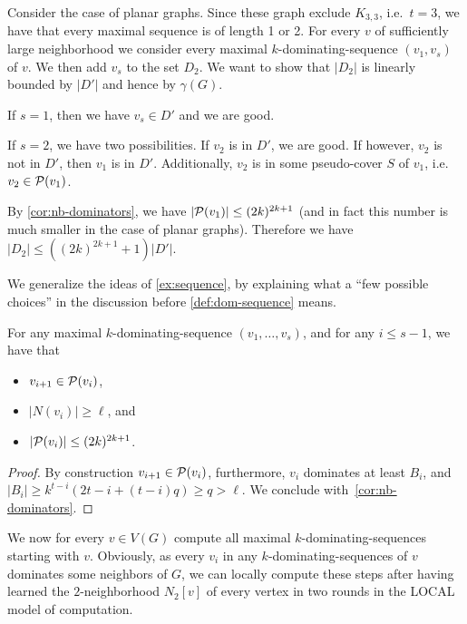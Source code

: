 \begin{example}\label{ex:sequence}
  Consider the case of planar graphs. Since these graph exclude $K_{3,3}$,
  i.e.~$t=3$, we have that every maximal sequence is of length 1 or 2.
  For every $v$ of sufficiently large neighborhood we consider every
  maximal $k$-dominating-sequence $(v_1,v_s)$ of $v$.
  We then add $v_s$ to the set $D_2$. We want to show that $|D_2|$ is
  linearly bounded by $|D'|$ and hence by $\gamma(G)$.

  If $s=1$, then we have $v_s\in D'$ and we are good.

  If $s=2$, we have two possibilities. If $v_2$ is in $D'$, we are good.
  If however, $v_2$ is not in $D'$, then $v_1$ is in
  $D'$. Additionally, $v_2$ is in some pseudo-cover $S$ of $v_1$,
  i.e.~$v_2\in \mathcal{P}(v_1)$.

  By \cref{cor:nb-dominators}, we have $|\mathcal{P}(v_1)|\le (2k)^{2k+1}$ (and
  in fact this number is much smaller in the case of planar graphs).
  Therefore we have  $|D_2| \le ((2k)^{2k+1}+1)|D'|$.
\end{example}

We generalize the ideas of \cref{ex:sequence}, by explaining what
a ``few possible choices''  in the discussion before \cref{def:dom-sequence}
means.

\begin{lemma}\label{lem:shape-sequences}
  For any maximal $k$-dominating-sequence $(v_1,\ldots,v_s)$,
  and for any $i\le s-1$, we have that
  \begin{itemize}
    \item $v_{i+1}\in \mathcal{P}(v_i)$,
    \item $|N(v_i)|\ge \ell$, and
    \item $|\mathcal{P}(v_i)|\le (2k)^{2k+1}$.
  \end{itemize}
\end{lemma}
\begin{proof}
  By construction $v_{i+1}\in \mathcal{P}(v_i)$, furthermore, $v_i$ dominates at least
  $B_i$, and
  $|B_{i}|\geq k^{t-i}(2t-i+(t-i)q) \ge q >\ell$.
  We conclude with~\cref{cor:nb-dominators}.
\end{proof}

We now for every $v\in V(G)$ compute all maximal $k$-dominating-sequences
starting with $v$.
Obviously, as every $v_i$ in any $k$-dominating-sequences of $v$ dominates some
neighbors of $G$, we can locally compute these steps after having
learned the $2$-neighborhood $N_2[v]$ of every vertex in two rounds
in the LOCAL model of computation.

